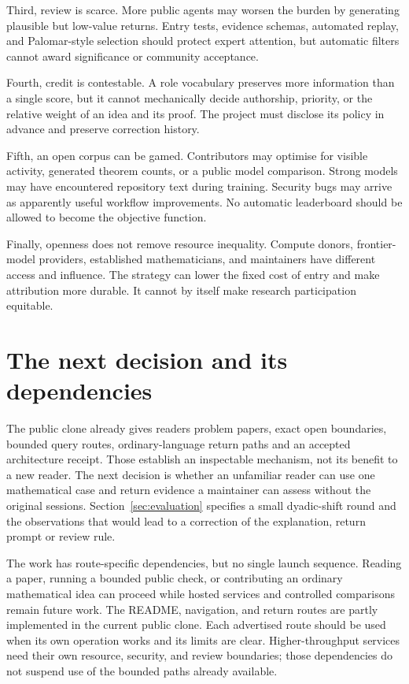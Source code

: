 \documentclass[10pt]{article}
\begin{document}
Third, review is scarce.  More public agents may worsen the burden by
generating plausible but low-value returns.  Entry tests, evidence schemas,
automated replay, and Palomar-style selection should protect expert attention,
but automatic filters cannot award significance or community acceptance.

Fourth, credit is contestable.  A role vocabulary preserves more information
than a single score, but it cannot mechanically decide authorship, priority,
or the relative weight of an idea and its proof.  The project must disclose
its policy in advance and preserve correction history.

Fifth, an open corpus can be gamed.  Contributors may optimise for visible
activity, generated theorem counts, or a public model comparison.  Strong
models may have encountered repository text during training.  Security bugs
may arrive as apparently useful workflow improvements.  No automatic
leaderboard should be allowed to become the objective function.

Finally, openness does not remove resource inequality.  Compute donors,
frontier-model providers, established mathematicians, and maintainers have
different access and influence.  The strategy can lower the fixed cost of
entry and make attribution more durable.  It cannot by itself make research
participation equitable.

\section{The next decision and its dependencies}\label{sec:execution}

The public clone already gives readers problem papers, exact open boundaries,
bounded query routes, ordinary-language return paths and an accepted
architecture receipt. Those establish an inspectable mechanism, not its
benefit to a new reader. The next decision is whether an unfamiliar reader
can use one mathematical case and return evidence a maintainer can assess
without the original sessions. Section~\ref{sec:evaluation} specifies a
small dyadic-shift round and the observations that would lead to a correction
of the explanation, return prompt or review rule.

The work has route-specific dependencies, but no single launch sequence.
Reading a paper, running a bounded public check, or contributing an ordinary
mathematical idea can proceed while hosted services and controlled comparisons
remain future work. The README, navigation, and return routes are partly
implemented in the current public clone. Each advertised route should be used
when its own operation works and its limits are clear. Higher-throughput
services need their own resource, security, and review boundaries; those
dependencies do not suspend use of the bounded paths already available.
\end{document}

